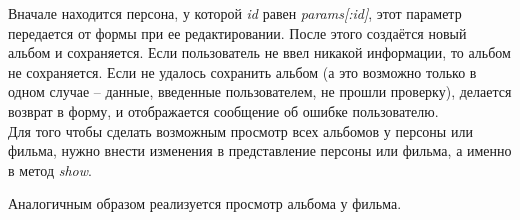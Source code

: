 Вначале находится персона, у которой \textit{id} равен \textit{params[:id]}, этот параметр передается от формы при ее редактировании. После этого создаётся новый альбом и сохраняется. Если пользователь не ввел никакой информации, то альбом не сохраняется. Если не удалось сохранить альбом (а это возможно только в одном случае -- данные, введенные пользователем,  не прошли проверку), делается возврат в форму, и отображается сообщение об ошибке пользователю.\\
\hspace*{0.5cm}Для того чтобы сделать возможным просмотр всех альбомов у персоны или фильма, нужно внести изменения в представление персоны или фильма, а именно в метод 
\textit{show}.


Аналогичным образом реализуется просмотр альбома у фильма.


\endinput


